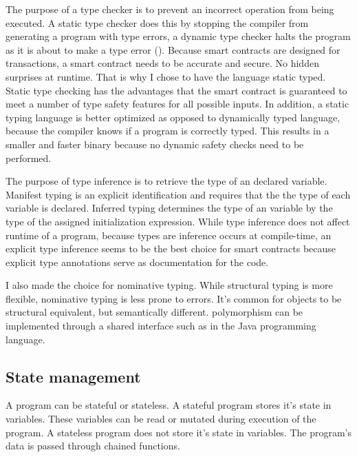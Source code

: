 \documentclass{uva-inf-article}
\begin{document}
\par The purpose of a type checker is to prevent an incorrect operation from being executed.
A static type checker does this by stopping the compiler from generating a program with type errors, 
a dynamic type checker halts the program as it is about to make a type error (\cite{matthews1987static}).
Because smart contracts are designed for transactions, a smart contract needs to be accurate and secure. 
No hidden surprises at runtime.
That is why I chose to have the language static typed.
Static type checking has the advantages that the smart contract is guaranteed to meet a number of type safety features for all possible inputs.
In addition, a static typing language is better optimized as opposed to dynamically typed language, because the compiler knows if a program is correctly typed.
This results in a smaller and faster binary because no dynamic safety checks need to be performed.
\vspace{5mm}

\par The purpose of type inference is to retrieve the type of an declared variable.
Manifest typing is an explicit identification and requires that the the type of each variable is declared.
Inferred typing determines the type of an variable by the type of the assigned initialization expression.
While type inference does not affect runtime of a program, because types are inference occurs at compile-time,
an explicit type inference seems to be the best choice for smart contracts because  
explicit type annotations serve as documentation for the code.
\vspace{5mm}

\par I also made the choice for nominative typing. 
While structural typing is more flexible, nominative typing is less prone to errors.
It's common for objects to be structural equivalent, but semantically different.
polymorphism can be implemented through a shared interface such as in the Java programming language.

\subsection{State management}
\par A program can be stateful or stateless. A stateful program stores it's state in variables.
These variables can be read or mutated during execution of the program.
A stateless program does not store it's state in variables. 
The program's data is passed through chained functions.\vspace{5mm}
\end{document}
